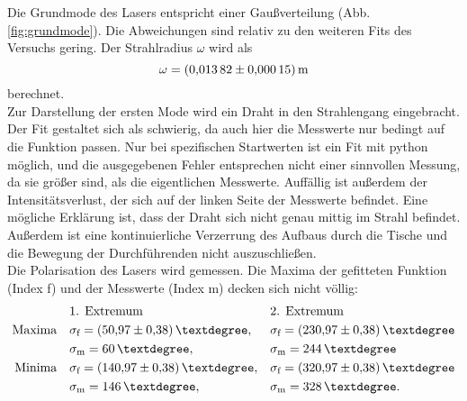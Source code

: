 Die Grundmode des Lasers entspricht einer Gaußverteilung (Abb. \ref{fig:grundmode}).
Die Abweichungen sind relativ zu den weiteren Fits des Versuchs gering.
Der Strahlradius $\omega$ wird als
\begin{equation*}
  \omega = \SI{ 0.01382 \pm 0.00015 }{m}
\end{equation*}
berechnet.\\
Zur Darstellung der ersten Mode wird ein Draht in den Strahlengang eingebracht.
Der Fit gestaltet sich als schwierig, da auch hier die Messwerte nur bedingt auf die Funktion passen.
Nur bei spezifischen Startwerten ist ein Fit mit python möglich, und die ausgegebenen Fehler entsprechen nicht einer sinnvollen Messung, da sie größer sind, als die eigentlichen Messwerte.
Auffällig ist außerdem der Intensitätsverlust, der sich auf der linken Seite der Messwerte befindet.
Eine mögliche Erklärung ist, dass der Draht sich nicht genau mittig im Strahl befindet.
Außerdem ist eine kontinuierliche Verzerrung des Aufbaus durch die Tische und die Bewegung der Durchführenden nicht auszuschließen.\\
Die Polarisation des Lasers wird gemessen.
Die Maxima der gefitteten Funktion (Index f) und der Messwerte (Index m) decken sich nicht völlig:
\begin{align*}
                &&& \text{1. Extremum}                            && \text{2. Extremum}   \\
  \text{Maxima} &&& \sigma_{\text{f}} = \SI{50.97 \pm 0.38}{°},   && \sigma_{\text{f}}  = \SI{230.97 \pm 0.38}{°} \\
                &&& \sigma_{\text{m}} = \SI{ 60 }{°},             && \sigma_{\text{m}}  = \SI{ 244 }{°} \\
  \text{Minima} &&& \sigma_{\text{f}} = \SI{140.97 \pm 0.38}{°},  && \sigma_{\text{f}}  = \SI{320.97 \pm 0.38}{°} \\
                &&& \sigma_{\text{m}} = \SI{ 146 }{°},            && \sigma_{\text{m}}  = \SI{ 328 }{°}. \\
\end{align*}
